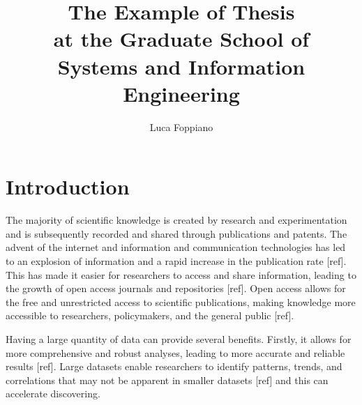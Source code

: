 \documentclass[12pt, a4paper]{report}
\title{The Example of Thesis \\ at the Graduate School of \\ Systems and Information Engineering}
\author{Luca Foppiano}
\begin{document}
\maketitle
\makeabstract
\maketableofcontents


\chapter{Introduction}






The majority of scientific knowledge is created by research and experimentation and is subsequently recorded and shared through publications and patents. 
The advent of the internet and information and communication technologies has led to an explosion of information and a rapid increase in the publication rate [ref]. 
This has made it easier for researchers to access and share information, leading to the growth of open access journals and repositories [ref]. 
Open access allows for the free and unrestricted access to scientific publications, making knowledge more accessible to researchers, policymakers, and the general public [ref]. 

Having a large quantity of data can provide several benefits. Firstly, it allows for more comprehensive and robust analyses, leading to more accurate and reliable results [ref]. 
Large datasets enable researchers to identify patterns, trends, and correlations that may not be apparent in smaller datasets [ref] and this can accelerate discovering.

\end{document}
